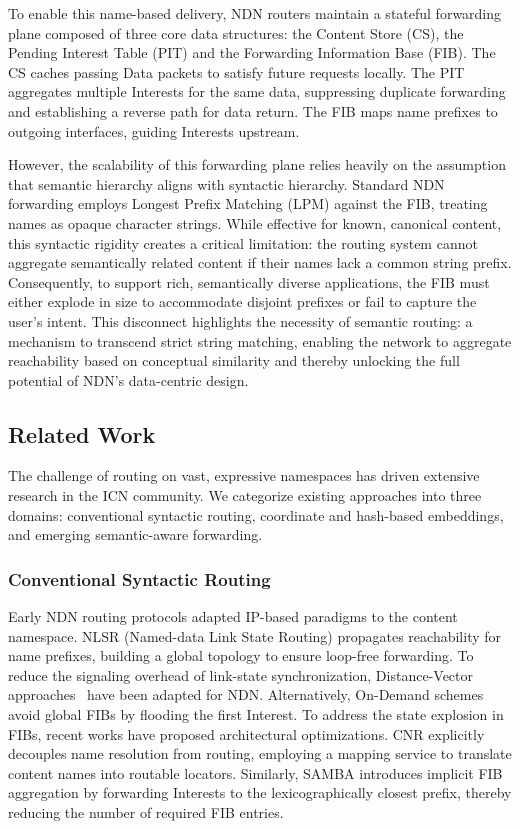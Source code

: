 \documentclass[conference]{IEEEtran}
\begin{document}
To enable this name-based delivery, NDN routers maintain a stateful forwarding plane composed of three core data structures: the Content Store (CS), the Pending Interest Table (PIT) and the Forwarding Information Base (FIB). The CS caches passing Data packets to satisfy future requests locally. The PIT aggregates multiple Interests for the same data, suppressing duplicate forwarding and establishing a reverse path for data return. The FIB maps name prefixes to outgoing interfaces, guiding Interests upstream.

However, the scalability of this forwarding plane relies heavily on the assumption that semantic hierarchy aligns with syntactic hierarchy. Standard NDN forwarding employs Longest Prefix Matching (LPM) against the FIB, treating names as opaque character strings. While effective for known, canonical content, this syntactic rigidity creates a critical limitation: the routing system cannot aggregate semantically related content if their names lack a common string prefix. Consequently, to support rich, semantically diverse applications, the FIB must either explode in size to accommodate disjoint prefixes or fail to capture the user's intent. This disconnect highlights the necessity of semantic routing: a mechanism to transcend strict string matching, enabling the network to aggregate reachability based on conceptual similarity and thereby unlocking the full potential of NDN's data-centric design.

\subsection{Related Work}
\label{sec:related_work}

The challenge of routing on vast, expressive namespaces has driven extensive research in the ICN community. We categorize existing approaches into three domains: conventional syntactic routing, coordinate and hash-based embeddings, and emerging semantic-aware forwarding.

\subsubsection{Conventional Syntactic Routing}
Early NDN routing protocols adapted IP-based paradigms to the content namespace. NLSR (Named-data Link State Routing)\cite{nlsr} propagates reachability for name prefixes, building a global topology to ensure loop-free forwarding. To reduce the signaling overhead of link-state synchronization, Distance-Vector approaches~\cite{distance_vector} have been adapted for NDN. Alternatively, On-Demand schemes~\cite{ondemand} avoid global FIBs by flooding the first Interest.
To address the state explosion in FIBs, recent works have proposed architectural optimizations. CNR\cite{cnr} explicitly decouples name resolution from routing, employing a mapping service to translate content names into routable locators. Similarly, SAMBA\cite{samba} introduces implicit FIB aggregation by forwarding Interests to the lexicographically closest prefix, thereby reducing the number of required FIB entries.
\end{document}
